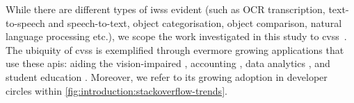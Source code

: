 While there are different types of \glspl{iws} evident (such as OCR transcription, text-to-speech and speech-to-text, object categorisation, object comparison, natural language processing etc.), we scope the work investigated in this study to \glspl{cvs}~. The ubiquity of \glspl{cvs} is exemplified through evermore growing applications that use these \glspl{api}: aiding the vision-impaired \citep{Reis:2018cp,daMotaSilveira:2017vp}, accounting  \citep{Marshall:2018uj}, data analytics \citep{Iyengar:2017fb}, and student education \citep{Dibia:2017iy}. Moreover, we refer to its growing adoption in developer circles within \cref{fig:introduction:stackoverflow-trends}.





